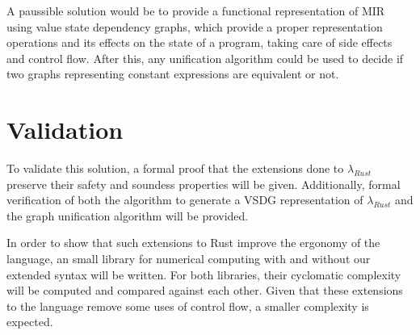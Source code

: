 A paussible solution would be to provide a functional representation of MIR
using value state dependency graphs, which provide a proper representation
operations and its effects on the state of a program, taking care of side
effects and control flow. After this, any unification algorithm could be used to
decide if two graphs representing constant expressions are equivalent or not.

\section{Validation}

To validate this solution, a formal proof that the extensions done to
$\lambda_{Rust}$ preserve their safety and soundess properties will be given.
Additionally, formal verification of both the algorithm to generate a VSDG
representation of $\lambda_{Rust}$ and the graph unification algorithm will be
provided.

In order to show that such extensions to Rust improve the ergonomy of the
language, an small library for numerical computing with and without our extended
syntax will be written. For both libraries, their cyclomatic complexity will be
computed and compared against each other. Given that these extensions to the
language remove some uses of control flow, a smaller complexity is expected.
